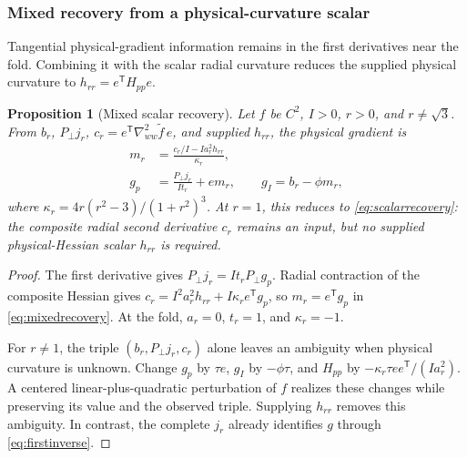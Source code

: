 \documentclass[10pt,a4paper]{article}
\newtheorem{proposition}[theorem]{Proposition}
\begin{document}
\subsubsection{Mixed recovery from a physical-curvature scalar}
Tangential physical-gradient information remains in the first derivatives near the fold. Combining it with the scalar radial curvature reduces the supplied physical curvature to $h_{rr}=e^{\mathsf T}H_{pp}e$.
\begin{proposition}[Mixed scalar recovery]
\label{prop:mixed}
Let $f$ be $C^2$, $I>0$, $r>0$, and $r\ne\sqrt3$. From $b_r$, $P_\perp j_r$, $c_r=e^{\mathsf T}\nabla^2_{ww}\widetilde f\,e$, and supplied $h_{rr}$, the physical gradient is
\begin{equation}
 \begin{aligned}
 m_r&=\frac{c_r/I-Ia_r^2h_{rr}}{\kappa_r},\\
 g_p&=\frac{P_\perp j_r}{It_r}+e m_r,\qquad
 g_I=b_r-\phi m_r,
 \end{aligned}
 \label{eq:mixedrecovery}
\end{equation}
where $\kappa_r=4r(r^2-3)/(1+r^2)^3$. At $r=1$, this reduces to \eqref{eq:scalarrecovery}: the composite radial second derivative $c_r$ remains an input, but no supplied physical-Hessian scalar $h_{rr}$ is required.
\end{proposition}
\begin{proof}
The first derivative gives $P_\perp j_r=It_rP_\perp g_p$. Radial contraction of the composite Hessian gives $c_r=I^2a_r^2h_{rr}+I\kappa_r e^{\mathsf T}g_p$, so $m_r=e^{\mathsf T}g_p$ in \eqref{eq:mixedrecovery}. At the fold, $a_r=0$, $t_r=1$, and $\kappa_r=-1$.

For $r\ne1$, the triple $(b_r,P_\perp j_r,c_r)$ alone leaves an ambiguity when physical curvature is unknown. Change $g_p$ by $\tau e$, $g_I$ by $-\phi\tau$, and $H_{pp}$ by $-\kappa_r\tau ee^{\mathsf T}/(Ia_r^2)$. A centered linear-plus-quadratic perturbation of $f$ realizes these changes while preserving its value and the observed triple. Supplying $h_{rr}$ removes this ambiguity. In contrast, the complete $j_r$ already identifies $g$ through \eqref{eq:firstinverse}.
\end{proof}
\end{document}
